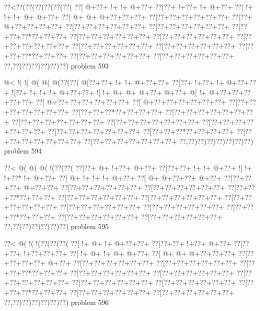\vbox{\vbox{\goo
\0??<\0??(\0??(\0??(\0??(\0??(\0??(
\0??[\- @+\0??+\- !+\- !+\- @+\0??+
\0??[\0??+\- !+\0??+\- !+\- @+\0??+
\0??[\- !+\- !+\- !+\- @+\- @+\0??+
\0??[\- @+\- @+\- @+\0??+\0??+\0??+
\0??[\0??+\0??+\0??+\0??+\0??+\0??+
\0??[\0??+\- @+\0??+\0??+\0??+\0??+
\0??[\0??+\0??+\0??+\0??+\0??+\0??+
\0??[\0??+\0??+\0??+\0??+\0??+\0??+
\0??[\0??+\0??+\0??*\0??+\0??+\0??+
\0??[\0??+\0??+\0??+\0??+\0??+\0??+
\0??[\0??+\0??+\0??+\0??+\0??+\0??+
\0??[\0??+\0??+\0??+\0??+\0??+\0??+
\0??[\0??+\0??+\0??+\0??+\0??+\0??+
\0??[\0??+\0??+\0??+\0??+\0??+\0??+
\0??[\0??+\0??+\0??*\0??+\0??+\0??+
\0??[\0??+\0??+\0??+\0??+\0??+\0??+
\0??[\0??+\0??+\0??+\0??+\0??+\0??+
\0??,\0??)\0??)\0??)\0??)\0??)\0??)
}
\hfil problem 593\hfil\break
}

\vbox{\vbox{\goo
\- @<\- !(\- !(\- @(\- @(\- @(\0??(\0??(
\- @[\0??+\0??+\- !+\- !+\- @+\0??+\0??+
\0??[\0??+\- !+\0??+\- !+\- @+\0??+\0??+
\- ![\0??+\- !+\- !+\- !+\- @+\0??+\0??+
\- ![\- !+\- @+\- @+\- @+\0??+\- @+\0??+
\- @[\- !+\- @+\0??+\0??+\0??+\0??+\0??+
\0??[\- @+\0??+\0??+\0??+\0??+\0??+\0??+
\0??[\- @+\0??+\0??+\0??+\0??+\0??+\0??+
\0??[\0??+\0??+\0??+\0??+\0??+\0??+\0??+
\0??[\0??+\0??+\0??*\0??+\0??+\0??+\0??+
\0??[\0??+\0??+\0??+\0??+\0??+\0??+\0??+
\0??[\0??+\0??+\0??+\0??+\0??+\0??+\0??+
\0??[\0??+\0??+\0??+\0??+\0??+\0??+\0??+
\0??[\0??+\0??+\0??+\0??+\0??+\0??+\0??+
\0??[\0??+\0??+\0??+\0??+\0??+\0??+\0??+
\0??[\0??+\0??+\0??*\0??+\0??+\0??+\0??+
\0??[\0??+\0??+\0??+\0??+\0??+\0??+\0??+
\0??[\0??+\0??+\0??+\0??+\0??+\0??+\0??+
\0??,\0??)\0??)\0??)\0??)\0??)\0??)\0??)
}
\hfil problem 594\hfil\break
}

\vbox{\vbox{\goo
\0??<\- @(\- @(\- @(\- !(\0??(\0??(
\0??[\0??+\- @+\- !+\0??+\- @+\0??+
\0??[\0??+\0??+\- !+\- !+\- @+\0??+
\- ![\- !+\- !+\0??*\- !+\- @+\0??+
\0??[\- @+\- !+\- !+\- !+\- @+\0??+
\0??[\- @+\- @+\0??+\0??+\- @+\0??+
\0??[\0??+\0??+\0??+\- @+\0??+\0??+
\0??[\0??+\0??+\0??+\0??+\0??+\0??+
\0??[\0??+\0??+\0??+\0??+\0??+\0??+
\0??[\0??+\0??+\0??*\0??+\0??+\0??+
\0??[\0??+\0??+\0??+\0??+\0??+\0??+
\0??[\0??+\0??+\0??+\0??+\0??+\0??+
\0??[\0??+\0??+\0??+\0??+\0??+\0??+
\0??[\0??+\0??+\0??+\0??+\0??+\0??+
\0??[\0??+\0??+\0??+\0??+\0??+\0??+
\0??[\0??+\0??+\0??*\0??+\0??+\0??+
\0??[\0??+\0??+\0??+\0??+\0??+\0??+
\0??[\0??+\0??+\0??+\0??+\0??+\0??+
\0??,\0??)\0??)\0??)\0??)\0??)\0??)
}
\hfil problem 595\hfil\break
}

\vbox{\vbox{\goo
\0??<\- @(\- !(\- !(\0??(\0??(\0??(
\0??[\- !+\- @+\- !+\- @+\0??+\0??+
\0??[\0??+\0??+\- !+\0??+\- @+\0??+
\0??[\0??+\0??+\- !+\0??+\0??+\0??+
\0??[\- !+\- @+\- !+\- @+\- @+\0??+
\0??[\- @+\- @+\- @+\0??+\0??+\0??+
\0??[\0??+\0??+\0??+\0??+\- @+\0??+
\0??[\0??+\0??+\0??+\0??+\0??+\0??+
\0??[\0??+\0??+\0??+\0??+\0??+\0??+
\0??[\0??+\0??+\0??*\0??+\0??+\0??+
\0??[\0??+\0??+\0??+\0??+\0??+\0??+
\0??[\0??+\0??+\0??+\0??+\0??+\0??+
\0??[\0??+\0??+\0??+\0??+\0??+\0??+
\0??[\0??+\0??+\0??+\0??+\0??+\0??+
\0??[\0??+\0??+\0??+\0??+\0??+\0??+
\0??[\0??+\0??+\0??*\0??+\0??+\0??+
\0??[\0??+\0??+\0??+\0??+\0??+\0??+
\0??[\0??+\0??+\0??+\0??+\0??+\0??+
\0??,\0??)\0??)\0??)\0??)\0??)\0??)
}
\hfil problem 596\hfil\break
}

